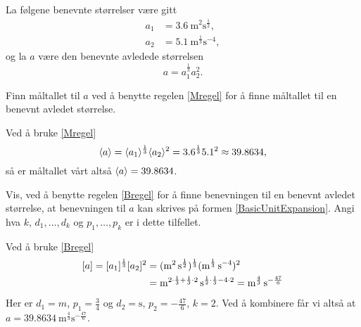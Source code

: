 \documentclass[a4paper,11pt]{article}
\begin{document}
\begin{problem}[1]
    La følgene benevnte størrelser være gitt
    \begin{align*}
      a_1 &= \SI{3.6}{\m\squared\s\tothe{\frac{1}{2}}},\\
      a_2 &= \SI{5.1}{\m\tothe{\frac{1}{3}}\s\tothe{-4}},
    \end{align*}
    og la $a$ være den benevnte avledede størrelsen
    \begin{equation*}
      a = a_1^{\frac{1}{3}}a_2^2.
    \end{equation*}
\end{problem}
\begin{subproblem}
    Finn måltallet til $a$ ved å benytte
    regelen \eqref{Mregel} for å finne måltallet til en benevnt avledet
    størrelse.
\end{subproblem}
\begin{solution}
    Ved å bruke \cref{Mregel} 
    \begin{equation}
          \langle a\rangle 
        = \langle a_1\rangle^{\frac{1}{3}}\langle a_2\rangle^2
        = \num{3.6}^{\frac{1}{3}}\num{5.1}^2
        \approx \num{39.8634},
    \end{equation}
    så er måltallet vårt altså $\langle a\rangle=\num{39.8634}$.
\end{solution}
\begin{subproblem}
    Vis, ved å benytte regelen \eqref{Bregel} for å finne
    benevningen til en benevnt avledet størrelse, at benevningen til
    $a$ kan skrives på formen \eqref{BasicUnitExpansion}. Angi hva
    $k$, $d_1,\dots,d_k$ og $p_1,\dots, p_k$ er i dette tilfellet.
\end{subproblem}
\begin{solution}
    Ved å bruke \cref{Bregel}
    \begin{align*}
            \bpar{a} 
          = \bpar{a_1}^{\frac{1}{3}}\bpar{a_2}^2
        & = (\si{\m\squared\s\tothe{\frac{1}{2}}})^{\frac{1}{3}}
            (\si{\m\tothe{\frac{1}{3}}\s\tothe{-4}})^2 \\
        & = \si{\m\tothe{2\cdot\frac{1}{3}+\frac{1}{3}\cdot 2}%
                \s\tothe{\frac{1}{2}\cdot\frac{1}{3}-4\cdot 2}}
          = \si{\m\tothe{\frac{4}{3}}\s\tothe{-\frac{47}{6}}}
    \end{align*}
    Her er $d_1 = \si{m}$, $p_1 = \frac{3}{4}$ og $d_2 = \si{\s}$, $p_2 = -\frac{47}{6}$, $k=2$.
    Ved å kombinere får vi altså at $a = \SI{39.8634}{\m\tothe{\frac{4}{3}}\s\tothe{-\frac{47}{6}}}$. 
\end{solution}
\end{document}

